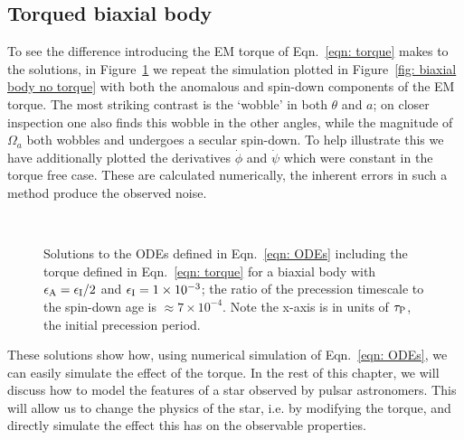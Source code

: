 \documentclass[../full_thesis/full_thesis.tex]{subfiles}
\begin{document}
\subsection{Torqued biaxial body}
\label{sec: biaxial body with torque}
To see the difference introducing the EM torque of Eqn.~\eqref{eqn: torque}  makes to the
solutions, in Figure~\ref{fig: biaxial body with torque} we repeat the simulation
plotted in Figure~\ref{fig: biaxial body no torque} with both the anomalous
and spin-down components of the EM torque. The most
striking contrast is the `wobble' in both $\theta$ and $a$; on closer
inspection one also finds this wobble in the other angles, while the magnitude of
$\Omega_a$ both wobbles and undergoes a secular spin-down. To help illustrate
this we have additionally plotted the derivatives $\dot{\phi}$ and $\dot{\psi}$
which were constant in the torque free case. These are calculated numerically,
the inherent errors in such a method produce the observed noise.
\afterpage{\clearpage}
\begin{figure}[p]
    \centering
{} \\
\caption{Solutions to the ODEs defined in Eqn.~\eqref{eqn: ODEs} including the
torque defined in Eqn.~\eqref{eqn: torque} for a biaxial body with
$\epsilon_{\mathrm{A}}=\epsilon_{\mathrm{I}}/2$ and $\epsilon_{\mathrm{I}}=1\times10^{-3}$; the ratio of the precession timescale
to the spin-down age is $\approx 7\times10^{-4}$. Note the x-axis is in units of
$\tau_{\mathrm{P}}$, the initial precession period.}
\label{fig: biaxial body with torque}
\end{figure}

These solutions show how, using numerical simulation of Eqn.~\eqref{eqn: ODEs},
we can easily simulate the effect of the \citet{Deutsch1955} torque. In the rest
of this chapter, we will discuss how to model the features of a star observed
by pulsar astronomers. This will allow us to change the physics of the star,
i.e. by modifying the torque, and directly simulate the effect this has on
the observable properties.
\end{document}
